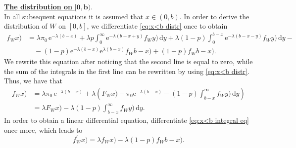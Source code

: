 \documentclass[reqno, 11pt, a4paper]{article}
\theoremstyle{plain}
\theoremstyle{remark}
\numberwithin{equation}{section}
\begin{document}
\noindent
\underline{\textbf{The distribution on} $\mathbf{[0,b)}.$}\\

In all subsequent equations it is assumed that $x\in(0,b)$. In order to derive the distribution of $W$ on $[0,b]$, we differentiate \eqref{eq:x<b distr} once to obtain
\begin{align*}
{\mbox{$f_W^{}$}}x)&=\lambda \pi_0 \, \mathrm{e}^{-\lambda (b-x)}+\lambda p \int_0^\infty \mathrm{e}^{-\lambda (b-x+y)} {\mbox{$f_W^{}$}}y) \,\mathrm{d}y+\lambda (1-p) \int_0^{b-x} \mathrm{e}^{-\lambda (b-x-y)} {\mbox{$f_W^{}$}}y) \,\mathrm{d}y-\\
       &\quad -(1-p)  \mathrm{e}^{-\lambda (b-x)}  \mathrm{e}^{\lambda (b-x)}{\mbox{$f_W^{}$}}b-x)+(1-p){\mbox{$f_W^{}$}}b-x).
\end{align*}
We rewrite this equation after noticing that the second line is equal to zero, while the sum of the integrals in the first line can be rewritten by using \eqref{eq:x<b distr}. Thus, we have that
\begin{align}\label{eq:x<b integral eq}
\nonumber {\mbox{$f_W^{}$}}x)&=\lambda \pi_0 \, \mathrm{e}^{-\lambda (b-x)}+\lambda\left({\mbox{$F_W^{}$}}x)-\pi_0 \mathrm{e}^{-\lambda (b-x)}-(1-p)\int_{b-x}^\infty {\mbox{$f_W^{}$}}y) \,\mathrm{d}y\right)\\
                &=\lambda{\mbox{$F_W^{}$}}x)-\lambda(1-p)\int_{b-x}^\infty {\mbox{$f_W^{}$}}y) \,\mathrm{d}y.
\end{align}
In order to obtain a linear differential equation, differentiate \eqref{eq:x<b integral eq} once more, which leads to
\begin{equation}\label{eq:x<b de}
{\mbox{$f_W^{'}$}}x)=\lambda {\mbox{$f_W^{}$}}x)-\lambda(1-p){\mbox{$f_W^{}$}}b-x).
\end{equation}
\end{document}
